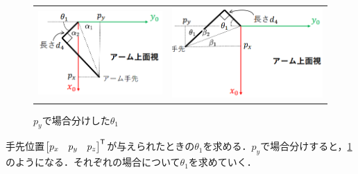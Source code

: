 \documentclass{ltjsarticle}
\begin{document}
\begin{figure}[H]
	\centering
	\begin{tabular}{cc}
		\begin{minipage}[c]{0.48\linewidth}
			\centering
			\includegraphics[width = 0.96\linewidth]{../figures/figures-theta1_py>0_edit.drawio.png}
			\subcaption{$p_y > 0$}
			\label{fig:py>0}
		\end{minipage}
		&
		\begin{minipage}[c]{0.48\linewidth}
			\centering
			\includegraphics[width = 0.96\linewidth]{../figures/figures-theta1_py<=0_edit.drawio.png}
			\subcaption{$p_y \leq 0$}
			\label{fig:py<=0}
		\end{minipage}
	\end{tabular}
	\caption{$p_y$で場合分けした$\theta_1$}
	\label{fig:pyで場合分けしたtheta1}
\end{figure}

手先位置$\mqty[p_x & p_y & p_z]^\mathsf{T}$が与えられたときの$\theta_1$を求める．$p_y$で場合分けすると，\cref{fig:pyで場合分けしたtheta1}のようになる．それぞれの場合について$\theta_1$を求めていく．
\end{document}
